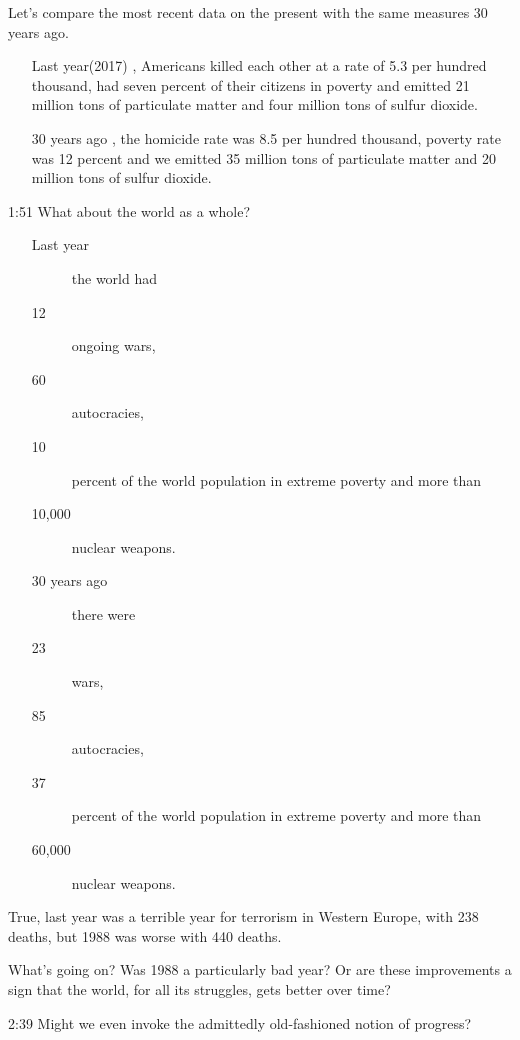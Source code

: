 \documentclass[10pt,titlepage]{book}
\begin{document}
{Let's compare the most recent data on the present
with the same measures 30 years ago.
\begin{itemize}
\item[Last year(2017)], Americans killed each other at a rate of 5.3 per hundred thousand,
had seven percent of their citizens in poverty
and emitted 21 million tons of particulate matter
and four million tons of sulfur dioxide.
\item[30 years ago], the homicide rate was 8.5 per hundred thousand,
poverty rate was 12 percent
and we emitted 35 million tons of particulate matter
and 20 million tons of sulfur dioxide.
\end{itemize}
1:51
What about the world as a whole?
\begin{itemize}
\item[Last year]
  \begin{description}
    \item[] the world had
    \item[12] ongoing wars,
\item[60] autocracies,
\item[10] percent of the world population in extreme poverty
  and more than
\item[10,000] nuclear weapons.
  \end{description}
\item[30 years ago]
  \begin{description}
  \item[]  there were
    \item[23] wars,
\item[85] autocracies,
\item[37] percent of the world population in extreme poverty
  and more than
\item[60,000] nuclear weapons.
   \end{description}
\end{itemize}

True, last year was a terrible year for terrorism in Western Europe,
with 238 deaths,
but 1988 was worse with 440 deaths.

What's going on?
Was 1988 a particularly bad year?
Or are these improvements a sign that the world, for all its struggles,
gets better over time?

2:39
Might we even invoke the admittedly old-fashioned notion of progress?

}
\end{document}
